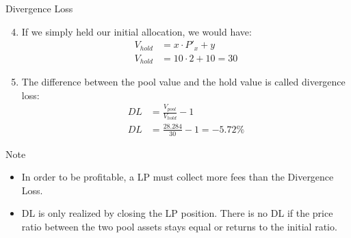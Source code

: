 \documentclass[]{beamer}
\begin{document}
\begin{frame}{Divergence Loss}

	\begin{enumerate}
	\setcounter{enumi}{3}
		\item If we simply held our initial allocation, we would have:
			\begin{align*}
				V_{hold} &= x \cdot P'_x + y\\
				V_{hold} &= 10 \cdot 2 + 10 = 30
			\end{align*}
		\item The difference between the pool value and the hold value is called divergence loss:
			\begin{align*}
				DL &= \tfrac{V_{pool}}{V_{hold}} - 1\\
				DL &= \tfrac{28.284}{30} - 1 = -5.72 \%
			\end{align*}
	\end{enumerate}	
	
	\begin{keytakeaway}{Note}
		\begin{itemize}
			\item In order to be profitable, a LP must collect more fees than the Divergence Loss.
			\item DL is only realized by closing the LP position. There is no DL if the price ratio between the two pool assets stays equal or returns to the initial ratio.
		\end{itemize}
	\end{keytakeaway}
	
\end{frame}

\end{document}
